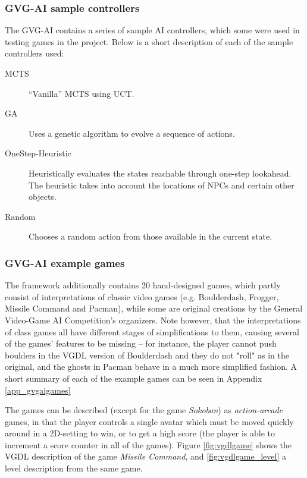 \documentclass[a4paper,titlepage,final]{report}
\begin{document}
\subsubsection*{GVG-AI sample controllers}
The GVG-AI contains a series of sample AI controllers, which some were used in testing games in the project.
Below is a short description of each of the sample controllers used:

\begin{description}
	\item [MCTS] ``Vanilla'' MCTS using UCT.
	\item [GA] Uses a genetic algorithm to evolve a sequence of actions.
	\item [OneStep-Heuristic] Heuristically evaluates the states reachable through one-step lookahead. The heuristic takes into account the locations of NPCs and certain other objects.
    \item [Random] Chooses a random action from those available in the current state.
\end{description}

\subsubsection*{GVG-AI example games}
The framework additionally contains 20 hand-designed games, which partly consist of interpretations of classic video games (e.g. Boulderdash, Frogger, Missile Command and Pacman), while some are original creations by the General Video-Game AI Competition's organizers. 
Note however, that the interpretations of class games all have different stages of simplifications to them, causing several of the games' features to be missing -- for instance, the player cannot push boulders in the VGDL version of Boulderdash and they do not "roll" as in the original, and the ghosts in Pacman behave in a much more simplified fashion.
A short summary of each of the example games can be seen in Appendix \ref{app_gvgaigames}

The games can be described (except for the game \emph{Sokoban}) as \textit{action-arcade} games, in that the player controls a single avatar which must be moved quickly around in a 2D-setting to win, or to get a high score (the player is able to increment a score  counter in all of the games).
Figure \ref{fig:vgdlgame} shows the VGDL description of the game \emph{Missile Command}, and \ref{fig:vgdlgame_level} a level description from the same game.
\end{document}
